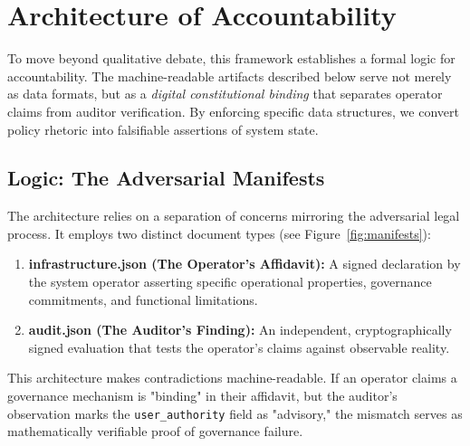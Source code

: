\documentclass{article}
\begin{document}
\appendix

\section{Architecture of Accountability}
\label{appendix:architecture}

To move beyond qualitative debate, this framework establishes a formal logic for accountability. The machine-readable artifacts described below serve not merely as data formats, but as a \textit{digital constitutional binding} that separates operator claims from auditor verification. By enforcing specific data structures, we convert policy rhetoric into falsifiable assertions of system state.

\subsection{Logic: The Adversarial Manifests}

The architecture relies on a separation of concerns mirroring the adversarial legal process. It employs two distinct document types (see Figure~\ref{fig:manifests}):

\begin{enumerate}
    \item \textbf{infrastructure.json (The Operator's Affidavit):} A signed declaration by the system operator asserting specific operational properties, governance commitments, and functional limitations.
    \item \textbf{audit.json (The Auditor's Finding):} An independent, cryptographically signed evaluation that tests the operator's claims against observable reality.
\end{enumerate}

This architecture makes contradictions machine-readable. If an operator claims a governance mechanism is "binding" in their affidavit, but the auditor's observation marks the \texttt{user\_authority} field as "advisory," the mismatch serves as mathematically verifiable proof of governance failure.
\end{document}
